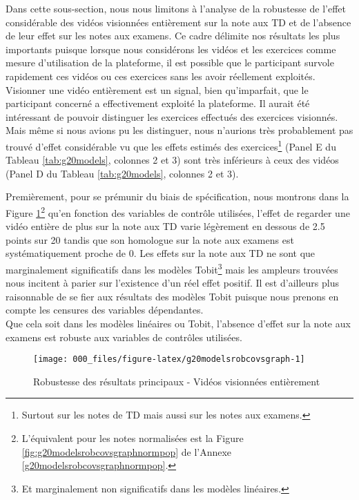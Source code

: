 \documentclass[
]{book}
\begin{document}
Dans cette sous-section, nous nous limitons à l'analyse de la robustesse de l'effet considérable des vidéos visionnées entièrement sur la note aux TD et de l'absence de leur effet sur les notes aux examens. Ce cadre délimite nos résultats les plus importants puisque lorsque nous considérons les vidéos et les exercices comme mesure d'utilisation de la plateforme, il est possible que le participant survole rapidement ces vidéos ou ces exercices sans les avoir réellement exploités. Visionner une vidéo entièrement est un signal, bien qu'imparfait, que le participant concerné a effectivement exploité la plateforme. Il aurait été intéressant de pouvoir distinguer les exercices effectués des exercices visionnés. Mais même si nous avions pu les distinguer, nous n'aurions très probablement pas trouvé d'effet considérable vu que les effets estimés des exercices\footnote{Surtout sur les notes de TD mais aussi sur les notes aux examens.} (Panel E du Tableau \ref{tab:g20models}, colonnes 2 et 3) sont très inférieurs à ceux des vidéos (Panel D du Tableau \ref{tab:g20models}, colonnes 2 et 3).

\quad Premièrement, pour se prémunir du biais de spécification, nous montrons dans la Figure \ref{fig:g20modelsrobcovsgraph}\footnote{L'équivalent pour les notes normalisées est la Figure \ref{fig:g20modelsrobcovsgraphnormpop} de l'Annexe \ref{g20modelsrobcovsgraphnormpop}.} qu'en fonction des variables de contrôle utilisées, l'effet de regarder une vidéo entière de plus sur la note aux TD varie légèrement en dessous de 2.5 points sur 20 tandis que son homologue sur la note aux examens est systématiquement proche de 0. Les effets sur la note aux TD ne sont que marginalement significatifs dans les modèles Tobit\footnote{Et marginalement non significatifs dans les modèles linéaires.} mais les ampleurs trouvées nous incitent à parier sur l'existence d'un réel effet positif. Il est d'ailleurs plus raisonnable de se fier aux résultats des modèles Tobit puisque nous prenons en compte les censures des variables dépendantes.\\
Que cela soit dans les modèles linéaires ou Tobit, l'absence d'effet sur la note aux examens est robuste aux variables de contrôles utilisées.

\begin{figure}[H]

{\centering \texttt{[image: 000\_files/figure-latex/g20modelsrobcovsgraph-1]} 

}

\caption{Robustesse des résultats principaux - Vidéos visionnées entièrement}\label{fig:g20modelsrobcovsgraph}
\end{figure}
\end{document}
